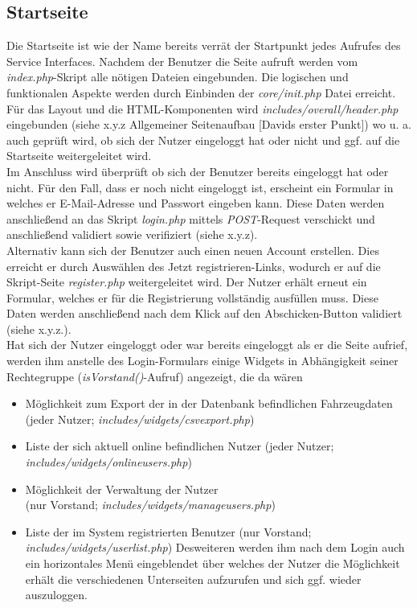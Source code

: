 \documentclass[fontsize = 12pt, paper = a4]{scrreprt}
\begin{document}
\subsection{Startseite}
Die Startseite ist wie der Name bereits verrät der Startpunkt jedes Aufrufes des Service Interfaces. Nachdem der Benutzer die Seite aufruft werden vom \textit{index.php}-Skript alle nötigen Dateien eingebunden. Die logischen und funktionalen Aspekte werden durch Einbinden der \textit{core/init.php} Datei erreicht. Für das Layout und die HTML-Komponenten wird \textit{includes/overall/header.php} eingebunden (siehe x.y.z Allgemeiner Seitenaufbau [Davids erster Punkt]) wo u. a. auch geprüft wird, ob sich der Nutzer eingeloggt hat oder nicht und ggf. auf die Startseite weitergeleitet wird.\\
Im Anschluss wird überprüft ob sich der Benutzer bereits eingeloggt hat oder nicht. Für den Fall, dass er noch nicht eingeloggt ist, erscheint ein Formular in welches er E-Mail-Adresse und Passwort eingeben kann. Diese Daten werden anschließend an das Skript \textit{login.php} mittels \textit{POST}-Request verschickt und anschließend validiert sowie verifiziert (siehe x.y.z).\\
Alternativ kann sich der Benutzer auch einen neuen Account erstellen. Dies erreicht er durch Auswählen des \glqq Jetzt registrieren\grqq-Links, wodurch er auf die Skript-Seite \textit{register.php} weitergeleitet wird. Der Nutzer erhält erneut ein Formular, welches er für die Registrierung vollständig ausfüllen muss. Diese Daten werden anschließend nach dem Klick auf den Abschicken-Button validiert (siehe x.y.z.).\\
Hat sich der Nutzer eingeloggt oder war bereits eingeloggt als er die Seite aufrief, werden ihm anstelle des Login-Formulars einige Widgets in Abhängigkeit seiner Rechtegruppe (\textit{isVorstand()}-Aufruf) angezeigt, die da wären

\begin{itemize}
 \item Möglichkeit zum Export der in der Datenbank befindlichen Fahrzeugdaten (jeder Nutzer; \textit{includes/widgets/csvexport.php})
 \item Liste der sich aktuell online befindlichen Nutzer (jeder Nutzer;\\ \textit{includes/widgets/onlineusers.php})
 \item Möglichkeit der Verwaltung der Nutzer\\ (nur Vorstand; \textit{includes/widgets/manageusers.php})
 \item Liste der im System registrierten Benutzer (nur Vorstand; \textit{includes/widgets/userlist.php})
Desweiteren werden ihm nach dem Login auch ein horizontales Menü eingeblendet über welches der Nutzer die Möglichkeit erhält die verschiedenen Unterseiten aufzurufen und sich ggf. wieder auszuloggen.
\end{itemize}
\end{document}
